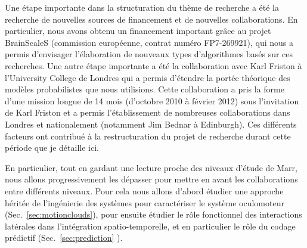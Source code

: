 Une étape importante dans la structuration du thème de recherche a été la recherche de nouvelles sources de financement et de nouvelles collaborations. En particulier, nous avons obtenu un financement important grâce au projet BrainScaleS (commission européenne, contrat numéro FP7-269921), qui nous a permis d'envisager l'élaboration de nouveaux types d'algorithmes basés sur ces recherches. Une autre étape importante a été la collaboration avec Karl Friston à l'University College de Londres qui a permis d'étendre la portée théorique des modèles probabilistes que nous utilisions. Cette collaboration a pris la forme d'une mission longue de 14 mois (d'octobre 2010 à février 2012) sous l'invitation de Karl Friston et a permis l'établissement de nombreuses collaborations dans Londres et nationalement (notamment Jim Bednar à Edinburgh). Ces différents facteurs ont contribué à la restructuration du projet de recherche durant cette période que je détaille ici.%

En particulier, tout en gardant une lecture proche des niveaux d'étude de Marr, nous allons progressivement les dépasser pour mettre en avant les collaborations entre différents niveaux. Pour cela nous allons d'abord étudier une approche héritée de l'ingénierie des systèmes pour caractériser le système oculomoteur (Sec.~\ref{sec:motionclouds}), pour ensuite étudier le rôle fonctionnel des interactions latérales dans l'intégration spatio-temporelle, et en particulier le rôle du codage prédictif (Sec.~\ref{sec:prediction}%
). %

